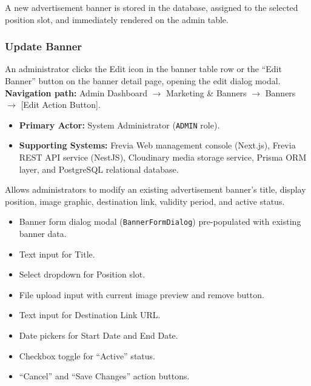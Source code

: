 \noindent A new advertisement banner is stored in the database, assigned to the selected position slot, and immediately rendered on the admin table.

\subsubsection{ Update Banner}

An administrator clicks the Edit icon in the banner table row or the ``Edit Banner'' button on the banner detail page, opening the edit dialog modal.\newline
\textbf{Navigation path:} Admin Dashboard $\rightarrow$ Marketing \& Banners $\rightarrow$ Banners $\rightarrow$ [Edit Action Button].


\begin{itemize}[leftmargin=1.6em,topsep=3pt,itemsep=2pt,parsep=0pt,label=$\bullet$]
    \item \textbf{Primary Actor:} System Administrator (\texttt{ADMIN} role).
    \item \textbf{Supporting Systems:} Frevia Web management console (Next.js), Frevia REST API service (NestJS), Cloudinary media storage service, Prisma ORM layer, and PostgreSQL relational database.
\end{itemize}

\noindent Allows administrators to modify an existing advertisement banner's title, display position, image graphic, destination link, validity period, and active status.

\begin{itemize}[leftmargin=1.6em,topsep=3pt,itemsep=2pt,parsep=0pt,label=$\bullet$]
    \item Banner form dialog modal (\texttt{BannerFormDialog}) pre-populated with existing banner data.
    \item Text input for Title.
    \item Select dropdown for Position slot.
    \item File upload input with current image preview and remove button.
    \item Text input for Destination Link URL.
    \item Date pickers for Start Date and End Date.
    \item Checkbox toggle for ``Active'' status.
    \item ``Cancel'' and ``Save Changes'' action buttons.
\end{itemize}

